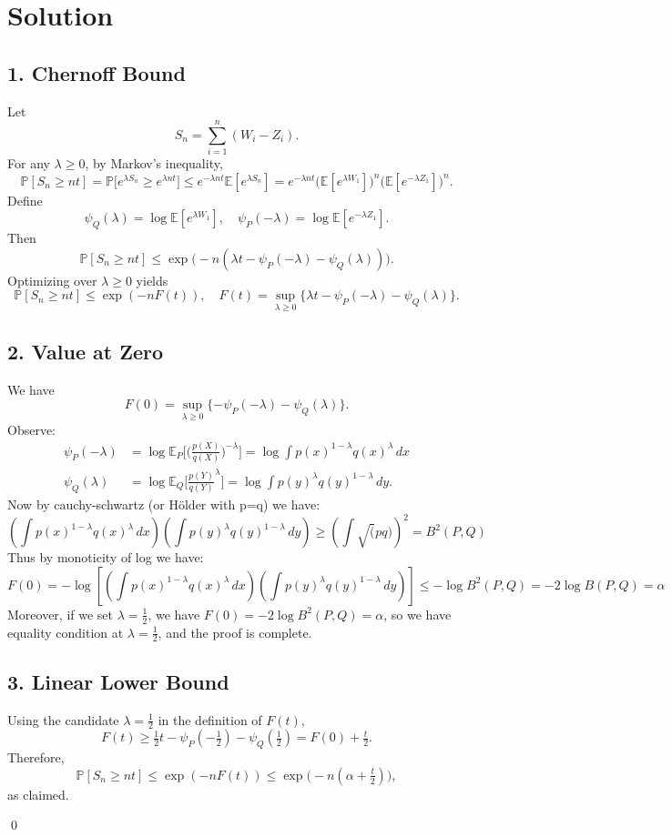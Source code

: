 \documentclass[11pt]{article}
\begin{document}
\section*{Solution}

\subsection*{1. Chernoff Bound}
Let
\[
S_n = \sum_{i=1}^n (W_i - Z_i).
\]
For any $\lambda \ge 0$, by Markov's inequality,
\[
\mathbb{P}[S_n \ge nt] 
= \mathbb{P}\bigl[e^{\lambda S_n} \ge e^{\lambda n t}\bigr]
\le e^{-\lambda n t} \mathbb{E}[e^{\lambda S_n}]
= e^{-\lambda n t} \bigl(\mathbb{E}[e^{\lambda W_1}]\bigr)^n \bigl(\mathbb{E}[e^{-\lambda Z_1}]\bigr)^n.
\]
Define
\[
\psi_Q(\lambda) = \log \mathbb{E}[e^{\lambda W_1}],
\quad
\psi_P(-\lambda) = \log \mathbb{E}[e^{-\lambda Z_1}].
\]
Then
\[
\mathbb{P}[S_n \ge nt] \le \exp\bigl(-n(\lambda t - \psi_P(-\lambda) - \psi_Q(\lambda))\bigr).
\]
Optimizing over $\lambda \ge 0$ yields
\[
\mathbb{P}[S_n \ge nt] \le \exp(-n F(t)),
\quad
F(t) = \sup_{\lambda \ge 0} \{\lambda t - \psi_P(-\lambda) - \psi_Q(\lambda)\}.
\]

\subsection*{2. Value at Zero}
We have
\[
F(0) = \sup_{\lambda \ge 0} \{ -\psi_P(-\lambda) - \psi_Q(\lambda) \}.
\]
Observe:
\begin{align*}
\psi_P(-\lambda) &= \log \mathbb{E}_P\bigl[\bigl(\tfrac{p(X)}{q(X)}\bigr)^{-\lambda}\bigr]
= \log \int p(x)^{1-\lambda} q(x)^\lambda \,dx \\
\psi_Q(\lambda) &= \log \mathbb{E}_Q\bigl[\tfrac{p(Y)}{q(Y)}^\lambda\bigr]
= \log \int p(y)^\lambda q(y)^{1-\lambda}\,dy.
\end{align*}
Now by cauchy-schwartz (or Hölder with p=q) we have:
\[
    \left(\int p(x)^{1-\lambda} q(x)^\lambda \,dx\right)\left(\int p(y)^\lambda q(y)^{1-\lambda}\,dy\right) \geq \left(\int \sqrt(pq)\right)^2 = B^2(P,Q)
\]
Thus by monoticity of log we have:
\[
F(0) = -\log \left[\left(\int p(x)^{1-\lambda} q(x)^\lambda \,dx\right)\left(\int p(y)^\lambda q(y)^{1-\lambda}\,dy\right) \right] \leq -\log B^2(P,Q) = -2 \log B(P,Q) = \alpha
\]
Moreover, if we set $\lambda = \tfrac12$, we have $F(0) = -2\log B^2(P,Q)= \alpha$, so we have equality condition at $\lambda = \tfrac12$, and the proof is complete.
\subsection*{3. Linear Lower Bound}
Using the candidate $\lambda = \tfrac12$ in the definition of $F(t)$,
\[
F(t) \ge \tfrac12 t - \psi_P(-\tfrac12) - \psi_Q(\tfrac12) = F(0) + \tfrac t2.
\]
Therefore,
\[
\mathbb{P}[S_n \ge nt] \le \exp(-n F(t)) \le \exp\bigl(-n(\alpha + \tfrac t2)\bigr),
\]
as claimed.

\qed
\end{document}
